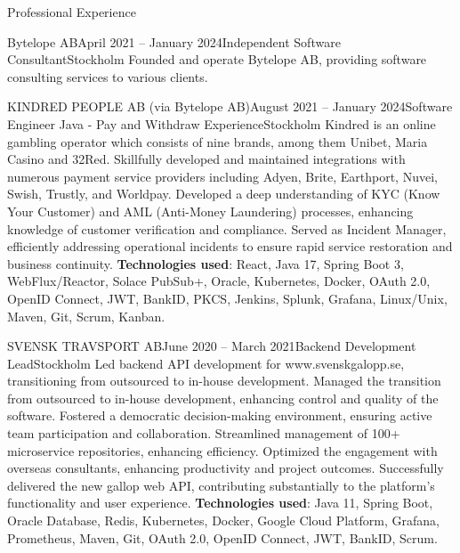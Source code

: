 \documentclass{resume}
\begin{document}
\begin{rSection}{Professional Experience}
\begin{rSubsection}{Bytelope AB}{April 2021 -- January 2024}{Independent Software Consultant}{Stockholm}
\bItem Founded and operate Bytelope AB, providing software consulting services to various clients.
\end{rSubsection}

\begin{rSubsection}{KINDRED PEOPLE AB (via Bytelope AB)}{August 2021 -- January 2024}{Software Engineer Java - Pay and Withdraw Experience}{Stockholm}
\bItem Kindred is an online gambling operator which consists of nine brands, among them Unibet, Maria Casino and 32Red.
\bItem Skillfully developed and maintained integrations with numerous payment service providers including Adyen, Brite, Earthport, Nuvei, Swish, Trustly, and Worldpay.
\bItem Developed a deep understanding of KYC (Know Your Customer) and AML (Anti-Money Laundering) processes, enhancing knowledge of customer verification and compliance.
\bItem Served as Incident Manager, efficiently addressing operational incidents to ensure rapid service restoration and business continuity.
\bItem \textbf{Technologies used}: React, Java 17, Spring Boot 3, WebFlux/Reactor, Solace PubSub+, Oracle, Kubernetes, Docker, OAuth 2.0, OpenID Connect, JWT, BankID, PKCS, Jenkins, Splunk, Grafana, Linux/Unix, Maven, Git, Scrum, Kanban.
\end{rSubsection}

\begin{rSubsection}{SVENSK TRAVSPORT AB}{June 2020 -- March 2021}{Backend Development Lead}{Stockholm}
\bItem Led backend API development for www.svenskgalopp.se, transitioning from outsourced to in-house development.
\bItem Managed the transition from outsourced to in-house development, enhancing control and quality of the software.
\bItem Fostered a democratic decision-making environment, ensuring active team participation and collaboration.
\bItem Streamlined management of 100+ microservice repositories, enhancing efficiency.
\bItem Optimized the engagement with overseas consultants, enhancing productivity and project outcomes.
\bItem Successfully delivered the new gallop web API, contributing substantially to the platform's functionality and user experience.
\bItem \textbf{Technologies used}: Java 11, Spring Boot, Oracle Database, Redis, Kubernetes, Docker, Google Cloud Platform, Grafana, Prometheus, Maven, Git, OAuth 2.0, OpenID Connect, JWT, BankID, Scrum.
\end{rSubsection}


\end{rSection}
\end{document}
